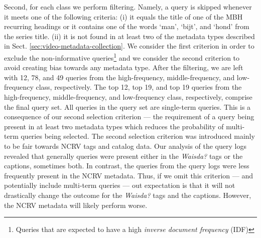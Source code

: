 Second, for each class we perform filtering. Namely, a query is skipped whenever it meets one of the following criteria: (i) it equals the title of one of the MBH recurring headings or it contains one of the words `man', `bijt', and `hond' from the series title. (ii)  it is not found in at least two of the metadata types described in Sect. \ref{sec:video-metadata-collection}. We consider the first criterion in order to exclude the non-informative queries\footnote{Queries that are expected to have a high \textit{inverse document frequency} (IDF)} and we consider the second criterion to avoid creating bias towards any metadata type. After the filtering, we are left with 12, 78, and 49 queries from the high-frequency, middle-frequency, and low-frequency class, respectively.
The top 12, top 19, and top 19 queries from the high-frequency, middle-frequency, and low-frequency class, respectively, comprise the final query set. All queries in the query set are single-term queries. This is a consequence of our second selection criterion --- the requirement of a query being present in at least two metadata types which reduces the probability of multi-term queries being selected. The second selection criterion was introduced mainly to be fair towards NCRV tags and catalog data. Our analysis of the query logs revealed that generally queries were present either in the \textit{Waisda?} tags or the captions, sometimes both. In contrast, the queries from the query logs were less frequently present in the NCRV metadata. Thus, if we omit this criterion --- and potentially include multi-term queries --- out expectation is that it will not drastically change the outcome for the \textit{Waisda?} tags and the captions. However, the NCRV metadata will likely perform worse.

